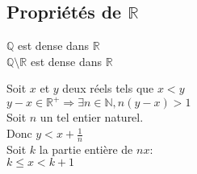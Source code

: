 \documentclass[12pt,twoside,a4paper]{article}
\begin{document}
		\subsection{Propriétés de $\mathbb{R}$}
			\begin{prop}
				$\mathbb{Q}$ est dense dans $\mathbb{R}$\\
				$\mathbb{Q}\setminus\mathbb{R}$ est dense dans $\mathbb{R}$
			\end{prop}
			\begin{preuve}
				Soit $x$ et $y$ deux réels tels que $x<y$\\
				$y-x\in\mathbb{R^+}\Rightarrow\exists n\in\mathbb{N}, n(y-x)>1$\\
				Soit $n$ un tel entier naturel.\\
				Donc $y<x+\frac{1}{n}$\\
				Soit $k$ la partie entière de $nx$:\\
				$k\leqslant x<k+1$
			\end{preuve}
\end{document}
